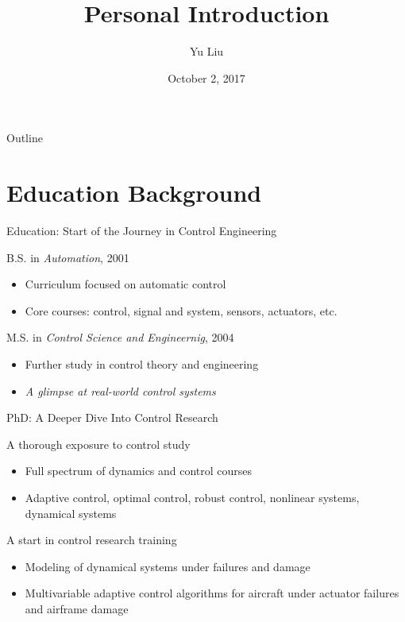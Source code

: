 \documentclass[presentation]{beamer}
\author{Yu Liu}
\date{October 2, 2017}
\title{Personal Introduction}
\begin{document}
\maketitle
\begin{frame}{Outline}
\tableofcontents
\end{frame}


\section{Education Background}
\label{sec:org553c340}
\begin{frame}[label={sec:orgaa26ebf}]{Education: Start of the Journey in  Control Engineering}
\begin{block}{B.S. in \emph{Automation}, 2001}
\begin{itemize}
\item Curriculum focused on automatic control
\item Core courses: control, signal and system, sensors, actuators,  etc.
\end{itemize}
\end{block}
\begin{block}{M.S. in \emph{Control Science and Engineernig}, 2004}
\begin{itemize}
\item Further study in control theory and engineering
\item \emph{A glimpse at real-world control systems}
\end{itemize}
\end{block}
\end{frame}

\begin{frame}[label={sec:org466008f}]{PhD: A Deeper Dive Into Control Research}
\begin{block}{A thorough exposure to control study}
\begin{itemize}
\item Full spectrum of dynamics and control courses
\item Adaptive control, optimal control, robust control,
nonlinear systems, dynamical systems
\end{itemize}
\end{block}

\begin{block}{A start in control research training}
\begin{itemize}
\item Modeling of dynamical systems under failures and damage
\item Multivariable adaptive control algorithms for
aircraft under actuator failures and airframe damage
\end{itemize}
\end{block}
\end{frame}
\end{document}
